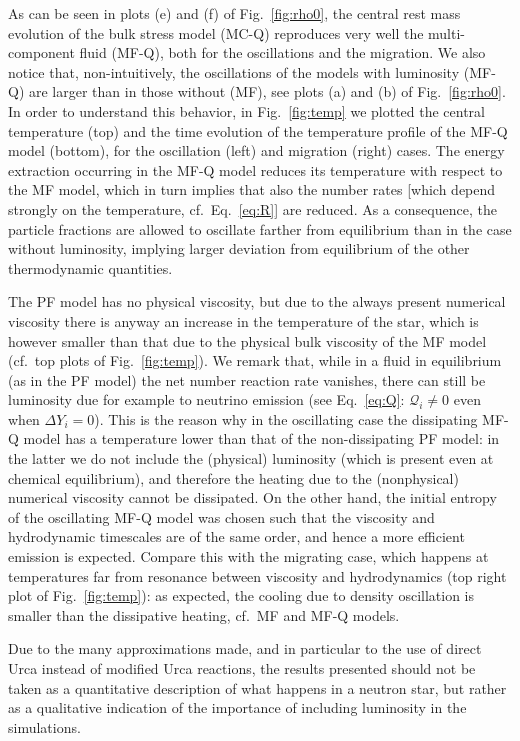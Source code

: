 \documentclass[aps,prd,twocolumn,a4paper,floatfix,nofootbib,superscriptaddress,nofootinbib]{revtex4}
\begin{document}
As can be seen in plots (e) and (f) of Fig.~\ref{fig:rho0}, the central rest mass evolution
of the bulk stress model (MC-Q) reproduces very well the multi-component
fluid (MF-Q), both for the oscillations and the migration.
We also notice that, non-intuitively, the oscillations of the models with luminosity (MF-Q) are larger
than in those without (MF), see plots (a) and (b) of Fig.~\ref{fig:rho0}.
In order to understand this behavior, in Fig.~\ref{fig:temp} we plotted
the central temperature (top) and the time evolution of the temperature profile of the MF-Q model (bottom),
for the oscillation (left) and migration (right) cases.
The energy extraction occurring in the MF-Q model
reduces its temperature with respect to the MF model,
which in turn  implies that
also the number rates [which depend strongly on the temperature,
cf.~Eq.~\eqref{eq:R}] are reduced. As a consequence, the particle
fractions are allowed to oscillate farther from equilibrium than in the case
without luminosity, implying larger deviation from equilibrium of the other
thermodynamic quantities.

The PF model has no physical viscosity, but due to the always present numerical viscosity
there is anyway an increase in the temperature of the star, which is however smaller
than that due to the physical bulk viscosity of the MF model (cf.~top plots of Fig.~\ref{fig:temp}).
%
We remark that, while in a fluid in equilibrium (as in the PF model) the net number
reaction rate vanishes, there can still be luminosity due for example to
neutrino emission (see Eq.~\eqref{eq:Q}: $\mathcal Q_i\neq0$ even when $\Delta
Y_i=0$).
%
This is the reason why in the oscillating case the dissipating MF-Q model has a
temperature lower than that of the non-dissipating PF model: in the latter we
do not include the (physical) luminosity (which is present even at chemical
equilibrium), and therefore the heating due to the (nonphysical) numerical
viscosity cannot be dissipated.
%
On the other hand, the initial entropy of the oscillating MF-Q model was
chosen such that the viscosity and hydrodynamic timescales are of the same
order, and hence a more efficient emission is expected.
%
Compare this with the migrating case, which happens at temperatures far from
resonance between viscosity and hydrodynamics (top right plot of
Fig.~\ref{fig:temp}): as expected, the cooling due to density oscillation is
smaller than the dissipative heating, cf.~MF and MF-Q models.

Due to the many approximations made, and in particular to the use of direct
Urca instead of modified Urca reactions, the results presented should not be
taken as a quantitative description of what happens in a neutron star, but
rather as a qualitative indication of the importance of including luminosity in
the simulations.
\end{document}
